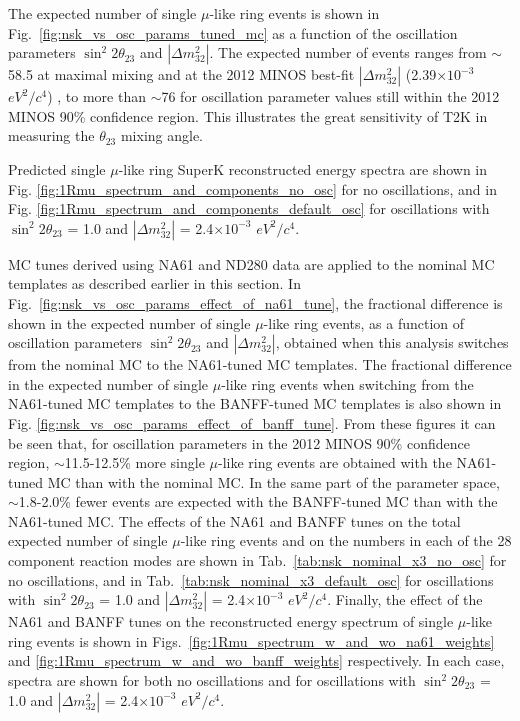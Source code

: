 The expected number of single $\mu$-like ring events is shown in Fig.\ \ref{fig:nsk_vs_osc_params_tuned_mc}
as a function of the oscillation parameters $\sin^{2}{2\theta_{23}}$ and $|\Delta m^{2}_{32}|$.
The expected number of events ranges from $\sim$58.5
at maximal mixing and at the 2012 MINOS best-fit $|\Delta m^{2}_{32}|$ (2.39$\times10^{-3}$ $eV^{2}/c^{4}$) \cite{MINOS2012},
to more than $\sim$76 for oscillation parameter values still within the 2012 MINOS 90\% confidence region.
This illustrates the great sensitivity of T2K in measuring the $\theta_{23}$ mixing angle.

Predicted single $\mu$-like ring SuperK reconstructed energy spectra are shown in 
Fig. \ref{fig:1Rmu_spectrum_and_components_no_osc} for no oscillations, and in
Fig. \ref{fig:1Rmu_spectrum_and_components_default_osc} for oscillations
with $\sin^{2}2\theta_{23}$ = 1.0 and $|\Delta m^{2}_{32}|$ = 2.4$\times10^{-3}$ $eV^{2}/c^{4}$.

MC tunes derived using NA61 and ND280 data are applied to the nominal MC templates as described earlier 
in this section.
In Fig.\ \ref{fig:nsk_vs_osc_params_effect_of_na61_tune}, the fractional difference is shown in 
the expected number of single $\mu$-like ring events, 
as a function of oscillation parameters $\sin^{2}{2\theta_{23}}$ and $|\Delta m^{2}_{32}|$,
obtained when this analysis switches from the nominal MC to the NA61-tuned MC templates. 
The fractional difference in the expected number of single $\mu$-like ring events 
when switching from the NA61-tuned MC templates to the BANFF-tuned MC templates is also shown in 
Fig. \ref{fig:nsk_vs_osc_params_effect_of_banff_tune}. 
From these figures it can be seen that, for oscillation parameters in the 2012 MINOS 90\% confidence region, 
$\sim$11.5-12.5\% more single $\mu$-like ring events are obtained with
the NA61-tuned MC than with the nominal MC.
In the same part of the parameter space, $\sim$1.8-2.0\% fewer events are expected with the BANFF-tuned MC 
than with the NA61-tuned MC.
The effects of the NA61 and BANFF tunes on the total expected number of single $\mu$-like ring events 
and on the numbers in each of the 28 component reaction modes are shown in 
Tab.\ \ref{tab:nsk_nominal_x3_no_osc} for no oscillations, and in
Tab.\ \ref{tab:nsk_nominal_x3_default_osc} for oscillations
with $\sin^{2}2\theta_{23}$ = 1.0 and $|\Delta m^{2}_{32}|$ = 2.4$\times10^{-3}$ $eV^{2}/c^{4}$.
Finally, the effect of the NA61 and BANFF tunes on the reconstructed energy spectrum of
single $\mu$-like ring events is shown in Figs.\
\ref{fig:1Rmu_spectrum_w_and_wo_na61_weights} and
\ref{fig:1Rmu_spectrum_w_and_wo_banff_weights} respectively. 
In each case, spectra are shown for both no oscillations and for
oscillations with $\sin^{2}2\theta_{23}$ = 1.0 and $|\Delta m^{2}_{32}|$ = 2.4$\times10^{-3}$ $eV^{2}/c^{4}$.

